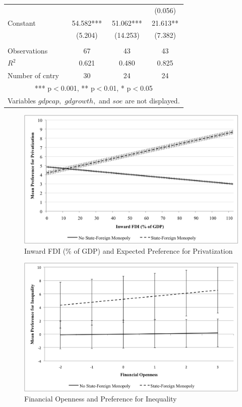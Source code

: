 \documentclass[12pt]{report}
\begin{document}
\begin{center}
\begin{table}
{\begin{tabular}{lccc}
 &  &  & (0.056) \\
Constant & 54.582*** & 51.062*** & 21.613** \\
 & (5.204) & (14.253) & (7.382) \\
 &  &  &  \\
Observations & 67 & 43 & 43 \\
$R^2$ & 0.621 & 0.480 & 0.825 \\
Number of cntry & 30 & 24 & 24 \\
\multicolumn{4}{c}{ *** p$<$0.001, ** p$<$0.01, * p$<$0.05} \\
\multicolumn{4}{c}{Variables $gdpcap,$ $gdgrowth,$ and $soe$ are not displayed.}\\
\end{tabular}
}
\label{default}
\end{table}
\end{center}
\doublespace

\begin{figure}[htbp]
\begin{center}
\includegraphics[scale=.75]{fdi.png}
\caption{{Inward FDI (\% of GDP) and Expected Preference for Privatization}}
\end{center}
\end{figure}

\begin{figure}[htbp]
\begin{center}
\includegraphics[scale=.75]{finopen.png}
\caption{{Financial Openness and Preference for Inequality}}
\end{center}
\end{figure}
\end{document}
